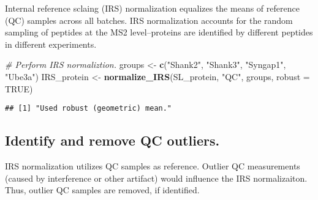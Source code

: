 \documentclass[]{article}
\newenvironment{Shaded}{\begin{snugshade}}{\end{snugshade}}
\newcommand{\KeywordTok}[1]{\textcolor[rgb]{0.13,0.29,0.53}{\textbf{#1}}}
\newcommand{\DataTypeTok}[1]{\textcolor[rgb]{0.13,0.29,0.53}{#1}}
\newcommand{\DecValTok}[1]{\textcolor[rgb]{0.00,0.00,0.81}{#1}}
\newcommand{\StringTok}[1]{\textcolor[rgb]{0.31,0.60,0.02}{#1}}
\newcommand{\CommentTok}[1]{\textcolor[rgb]{0.56,0.35,0.01}{\textit{#1}}}
\newcommand{\OtherTok}[1]{\textcolor[rgb]{0.56,0.35,0.01}{#1}}
\newcommand{\OperatorTok}[1]{\textcolor[rgb]{0.81,0.36,0.00}{\textbf{#1}}}
\newcommand{\NormalTok}[1]{#1}
\begin{document}
Internal reference sclaing (IRS) normalization equalizes the means of
reference (QC) samples across all batches. IRS normalization accounts
for the random sampling of peptides at the MS2 level--proteins are
identified by different peptides in different experiments.

\begin{Shaded}
\begin{Highlighting}[]
\CommentTok{# Perform IRS normaliztion.}
\NormalTok{groups <-}\StringTok{ }\KeywordTok{c}\NormalTok{(}\StringTok{"Shank2"}\NormalTok{, }\StringTok{"Shank3"}\NormalTok{, }\StringTok{"Syngap1"}\NormalTok{, }\StringTok{"Ube3a"}\NormalTok{)}
\NormalTok{IRS_protein <-}\StringTok{ }\KeywordTok{normalize_IRS}\NormalTok{(SL_protein, }\StringTok{"QC"}\NormalTok{, groups, }\DataTypeTok{robust =} \OtherTok{TRUE}\NormalTok{)}
\end{Highlighting}
\end{Shaded}

\begin{verbatim}
## [1] "Used robust (geometric) mean."
\end{verbatim}

\subsection{Identify and remove QC
outliers.}\label{identify-and-remove-qc-outliers.}

IRS normalization utilizes QC samples as reference. Outlier QC
measurements (caused by interference or other artifact) would influence
the IRS normalizaiton. Thus, outlier QC samples are removed, if
identified.

\begin{Shaded}
\end{Shaded}
\end{document}
